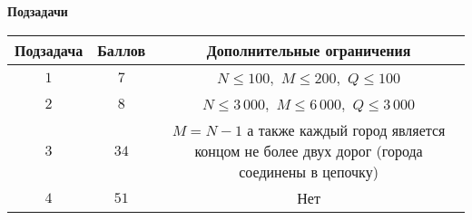 \bf{Подзадачи}

\begin{tabular}{|c|c|c|}\hline
\bf{Подзадача}&\bf{Баллов}&\bf{Дополнительные ограничения}\\\hline
$1$&$7$&$N \le 100,$ $M \le 200,$ $Q \le 100$ \\\hline
$2$&$8$&$N \le 3\,000,$ $M \le 6\,000,$ $Q \le 3\,000$ \\\hline
$3$&$34$&$M=N-1$ а также каждый город является концом не более двух дорог (города соединены в цепочку) \\\hline
$4$&$51$&Нет \\\hline
\end{tabular}
